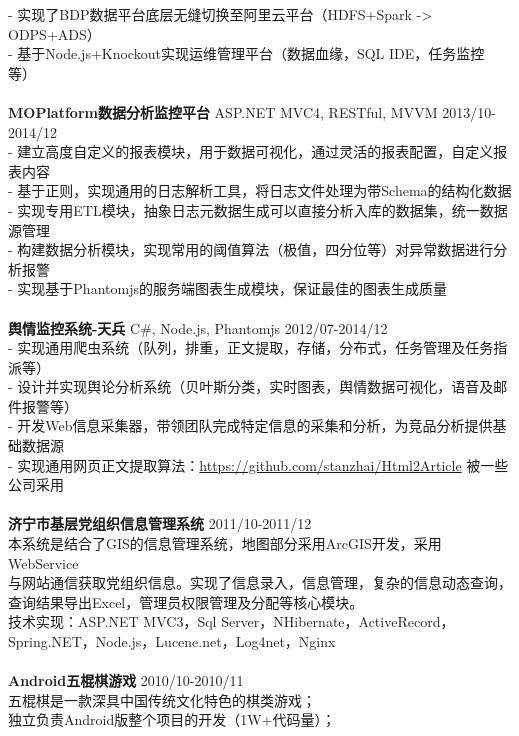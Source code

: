 \documentclass[UTF8,margin,line]{res}
\begin{document}
\begin{resume}
- 实现了BDP数据平台底层无缝切换至阿里云平台（HDFS+Spark -> ODPS+ADS） \\
- 基于Node.js+Knockout实现运维管理平台（数据血缘，SQL IDE，任务监控等） \\
\\
\textbf{MOPlatform数据分析监控平台} ASP.NET MVC4, RESTful, MVVM 2013/10-2014/12 \\
- 建立高度自定义的报表模块，用于数据可视化，通过灵活的报表配置，自定义报表内容 \\
- 基于正则，实现通用的日志解析工具，将日志文件处理为带Schema的结构化数据 \\
- 实现专用ETL模块，抽象日志元数据生成可以直接分析入库的数据集，统一数据源管理 \\
- 构建数据分析模块，实现常用的阈值算法（极值，四分位等）对异常数据进行分析报警 \\
- 实现基于Phantomjs的服务端图表生成模块，保证最佳的图表生成质量 \\
\\
\textbf{舆情监控系统-天兵} C\#, Node.js, Phantomjs 2012/07-2014/12 \\
- 实现通用爬虫系统（队列，排重，正文提取，存储，分布式，任务管理及任务指派等） \\
- 设计并实现舆论分析系统（贝叶斯分类，实时图表，舆情数据可视化，语音及邮件报警等） \\
- 开发Web信息采集器，带领团队完成特定信息的采集和分析，为竞品分析提供基础数据源 \\
- 实现通用网页正文提取算法：\url{https://github.com/stanzhai/Html2Article} 被一些公司采用 \\
\\
\textbf{济宁市基层党组织信息管理系统}  2011/10-2011/12 \\
本系统是结合了GIS的信息管理系统，地图部分采用ArcGIS开发，采用WebService \\
与网站通信获取党组织信息。实现了信息录入，信息管理，复杂的信息动态查询， \\
查询结果导出Excel，管理员权限管理及分配等核心模块。\\
技术实现：ASP.NET MVC3，Sql Server，NHibernate，ActiveRecord， \\
Spring.NET，Node.js，Lucene.net，Log4net，Nginx \\
\\
\textbf{Android五棍棋游戏}  2010/10-2010/11 \\
五棍棋是一款深具中国传统文化特色的棋类游戏； \\
独立负责Android版整个项目的开发（1W+代码量）； \\

\end{resume}
\end{document}
